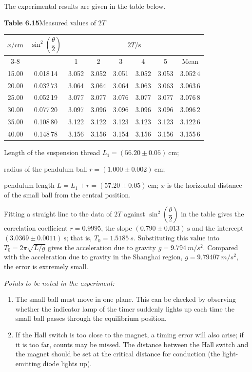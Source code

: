 The experimental results are given in the table below.

\begin{center}
\begin{minipage}{\linewidth}
\centering
\textbf{Table 6.15}\quad Measured values of $2T$\\[3pt]
\begin{tabular}{cccccccc}
\toprule
$x/\mathrm{cm}$ & $\sin^{2}\left(\dfrac{\theta}{2}\right)$ & \multicolumn{6}{c}{$2T/\mathrm{s}$}\\
\cmidrule(lr){3-8}
 & & 1 & 2 & 3 & 4 & 5 & Mean\\
\midrule
15.00 & 0.018\,14 & 3.052 & 3.052 & 3.051 & 3.052 & 3.053 & 3.052\,4\\
20.00 & 0.032\,73 & 3.064 & 3.064 & 3.064 & 3.063 & 3.063 & 3.063\,6\\
25.00 & 0.052\,19 & 3.077 & 3.077 & 3.076 & 3.077 & 3.077 & 3.076\,8\\
30.00 & 0.077\,20 & 3.097 & 3.096 & 3.096 & 3.096 & 3.096 & 3.096\,2\\
35.00 & 0.108\,80 & 3.122 & 3.122 & 3.123 & 3.123 & 3.123 & 3.122\,6\\
40.00 & 0.148\,78 & 3.156 & 3.156 & 3.154 & 3.156 & 3.156 & 3.155\,6\\
\bottomrule
\end{tabular}
\end{minipage}
\end{center}

\noindent Length of the suspension thread $L_1=(56.20\pm0.05)\ \mathrm{cm}$;

\noindent radius of the pendulum ball $r=(1.000\pm0.002)\ \mathrm{cm}$;

\noindent pendulum length $L=L_1+r=(57.20\pm0.05)\ \mathrm{cm}$; $x$ is the horizontal distance of the small ball from the central position.

Fitting a straight line to the data of $2T$ against $\sin^{2}\left(\dfrac{\theta}{2}\right)$ in the table gives the correlation coefficient $r=0.9995$, the slope $(0.790\pm0.013)\ \mathrm{s}$ and the intercept $(3.0369\pm0.0011)\ \mathrm{s}$; that is, $T_0=\SI{1.5185}{s}$. Substituting this value into $T_0=2\pi\sqrt{L/g}$ gives the acceleration due to gravity $g=\SI{9.794}{m/s^2}$. Compared with the acceleration due to gravity in the Shanghai region, $g=\SI{9.79407}{m/s^2}$, the error is extremely small.

\noindent\textit{Points to be noted in the experiment:}
\begin{enumerate}[label=(\arabic*),leftmargin=2.2em,itemsep=1pt,topsep=2pt]
\item The small ball must move in one plane. This can be checked by observing whether the indicator lamp of the timer suddenly lights up each time the small ball passes through the equilibrium position.
\item If the Hall switch is too close to the magnet, a timing error will also arise; if it is too far, counts may be missed. The distance between the Hall switch and the magnet should be set at the critical distance for conduction (the light-emitting diode lights up).
\end{enumerate}

